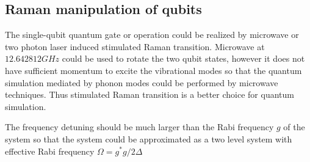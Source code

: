 \subsection{Raman manipulation of qubits} %
\label{sub:raman_manipulation_of_qubits}
The single-qubit quantum gate or operation could be realized by microwave or two photon laser induced stimulated Raman transition. Microwave at $12.642812\unit{GHz}$ could be used to rotate the two qubit states, however it does not have sufficient momentum to excite the vibrational modes so that the quantum simulation mediated by phonon modes could be performed by microwave techniques. Thus stimulated Raman transition is a better choice for quantum simulation.

The frequency detuning should be much larger than the Rabi frequency $g$ of the system so that the system could be approximated as a two level system with effective Rabi frequency $\Omega=g^*g/2\Delta$
